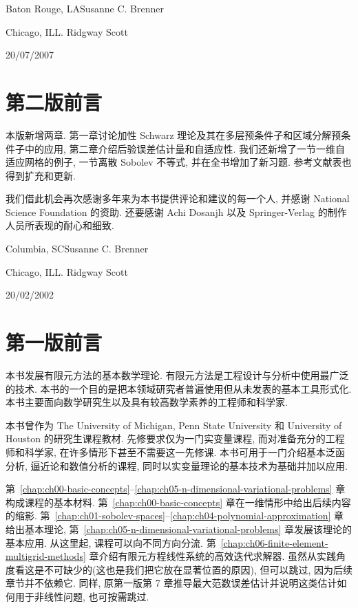 \begin{flushright}
Baton Rouge, LA\qquad Susanne C. Brenner\par
Chicago, IL\qquad L. Ridgway Scott\par
20/07/2007
\end{flushright}

\clearpage
\section*{第二版前言}
\label{front:preface-second-edition}

本版新增两章. 第一章讨论加性 Schwarz 理论及其在多层预条件子和区域分解预条件子中的应用, 第二章介绍后验误差估计量和自适应性. 我们还新增了一节一维自适应网格的例子, 一节离散 Sobolev 不等式, 并在全书增加了新习题. 参考文献表也得到扩充和更新.

我们借此机会再次感谢多年来为本书提供评论和建议的每一个人, 并感谢 National Science Foundation 的资助. 还要感谢 Achi Dosanjh 以及 Springer-Verlag 的制作人员所表现的耐心和细致.

\begin{flushright}
Columbia, SC\qquad Susanne C. Brenner\par
Chicago, IL\qquad L. Ridgway Scott\par
20/02/2002
\end{flushright}

\clearpage
\section*{第一版前言}
\label{front:preface-first-edition}

本书发展有限元方法的基本数学理论. 有限元方法是工程设计与分析中使用最广泛的技术. 本书的一个目的是把本领域研究者普遍使用但从未发表的基本工具形式化. 本书主要面向数学研究生以及具有较高数学素养的工程师和科学家.

本书曾作为 The University of Michigan, Penn State University 和 University of Houston 的研究生课程教材. 先修要求仅为一门实变量课程, 而对准备充分的工程师和科学家, 在许多情形下甚至不需要这一先修课. 本书可用于一门介绍基本泛函分析, 逼近论和数值分析的课程, 同时以实变量理论的基本技术为基础并加以应用.

第~\ref{chap:ch00-basic-concepts}--\ref{chap:ch05-n-dimensional-variational-problems} 章构成课程的基本材料. 第~\ref{chap:ch00-basic-concepts} 章在一维情形中给出后续内容的缩影. 第~\ref{chap:ch01-sobolev-spaces}--\ref{chap:ch04-polynomial-approximation} 章给出基本理论, 第~\ref{chap:ch05-n-dimensional-variational-problems} 章发展该理论的基本应用. 从这里起, 课程可以向不同方向分流. 第~\ref{chap:ch06-finite-element-multigrid-methods} 章介绍有限元方程线性系统的高效迭代求解器. 虽然从实践角度看这是不可缺少的(这也是我们把它放在显著位置的原因), 但可以跳过, 因为后续章节并不依赖它. 同样, 原第一版第 7 章推导最大范数误差估计并说明这类估计如何用于非线性问题, 也可按需跳过.

